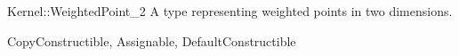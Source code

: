 \begin{ccRefConcept}{Kernel::WeightedPoint_2}
A type representing weighted points in two dimensions.

\ccRefines
CopyConstructible, Assignable, DefaultConstructible

\ccSeeAlso
{} \\
 \\
 \\
 \\

\end{ccRefConcept}
